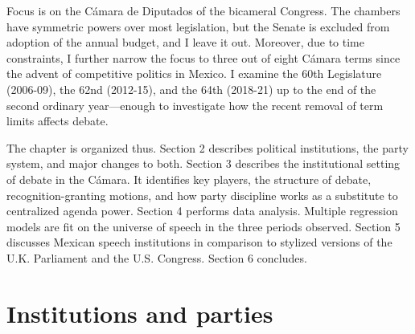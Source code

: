 \documentclass[letter,12pt]{article}
\begin{document}
Focus is on the Cámara de Diputados of the bicameral Congress. The chambers have symmetric powers over most legislation, but the Senate is excluded from adoption of the annual budget, and I leave it out. Moreover, due to time constraints, I further narrow the focus to three out of eight Cámara terms since the advent of competitive politics in Mexico. I examine the 60th Legislature (2006-09), the 62nd (2012-15), and the 64th (2018-21) up to the end of the second ordinary year---enough to investigate how the recent removal of term limits affects debate.

The chapter is organized thus. Section 2 describes political institutions, the party system, and major changes to both. Section 3 describes the institutional setting of debate in the Cámara. It identifies key players, the structure of debate, recognition-granting motions, and how party discipline works as a substitute to centralized agenda power. Section 4 performs data analysis. Multiple regression models are fit on the universe of speech in the three periods observed. Section 5 discusses Mexican speech institutions in comparison to stylized versions of the U.K. Parliament and the U.S. Congress. Section 6 concludes. 

\section{Institutions and parties} %





\end{document}

